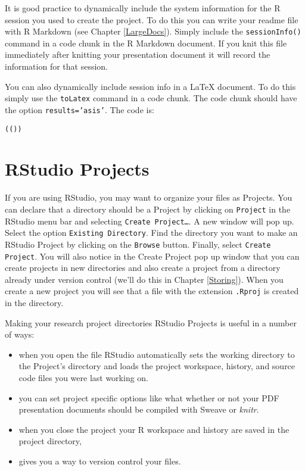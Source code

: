 {It is good practice to dynamically include the system information for the R session you used to create the project. To do this you can write your readme file with R Markdown (see Chapter \ref{LargeDocs}). Simply include the \texttt{sessionInfo()} command in a code chunk in the R Markdown document. If you knit this file immediately after knitting your presentation document it will record the information for that session.

\noindent You can also dynamically include session info in a LaTeX document. To do this simply use the {\tt{toLatex}} command in a code chunk. The code chunk should have the option \texttt{results='asis'}. The code is:

\begin{knitrout}
\color{fgcolor}\begin{kframe}
\begin{alltt}
(())
\end{alltt}
\end{kframe}
\end{knitrout}



\section{RStudio Projects}

If you are using RStudio, you may want to organize your files as Projects. You can declare that a directory should be a Project by clicking on \texttt{Project} in the RStudio menu bar and selecting \texttt{Create Project\ldots}. A new window will pop up. Select the option \texttt{Existing Directory}. Find the directory you want to make an RStudio Project by clicking on the \texttt{Browse} button. Finally, select \texttt{Create Project}. You will also notice in the Create Project pop up window that you can create projects in new directories and also create a project from a directory already under version control (we'll do this in Chapter \ref{Storing}). When you create a new project you will see that a file with the extension \texttt{.Rproj} is created in the directory.

Making your research project directories RStudio Projects is useful in a number of ways:

\begin{itemize}
    \item when you open the  file RStudio automatically sets the working directory to the Project's directory and loads the project workspace, history, and source code files you were last working on.
    \item you can set project specific options like what whether or not your PDF presentation documents should be compiled with Sweave or {\emph{knitr}}.
    \item when you close the project your R workspace and history are saved in the project directory,
    \item gives you a way to version control your files.
\end{itemize}

}
